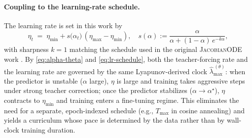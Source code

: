 \paragraph{Coupling to the learning-rate schedule.}
The learning rate is set in this work by
%
\begin{equation}
  \eta_t \;=\; \eta_{\min} + s\!\bigl(\alpha_t\bigr)\,(\eta_{\max} - \eta_{\min}),
  \quad
  s(\alpha) := \frac{\alpha}{\alpha + (1-\alpha)\,e^{-k\alpha}},
  \label{eq:lr-schedule}
\end{equation}
%
with sharpness $k=1$ matching the schedule used in the original
\textsc{JacobianODE} work \citep{TODOOriginalJacobianODE}. By
\eqref{eq:alpha-theta} and \eqref{eq:lr-schedule}, both the
teacher-forcing rate and the learning rate are governed by the same
Lyapunov-derived clock $\widehat{\lambda}_{\max}^{\,(\theta)}$: when
the predictor is unstable ($\alpha$ large), $\eta$ is large and
training takes aggressive steps under strong teacher correction; once
the predictor stabilizes ($\alpha \to \alpha^\star$), $\eta$
contracts to $\eta_{\min}$ and training enters a fine-tuning regime.
This eliminates the need for a separate, epoch-indexed schedule (e.g.,
$T_{\max}$ in cosine annealing) and yields a curriculum whose pace is
determined by the data rather than by wall-clock training duration.
